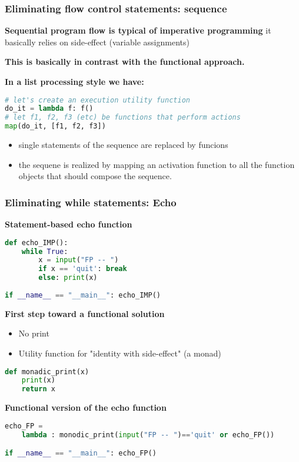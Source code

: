 \subsubsection{Eliminating flow control statements: sequence}

\textbf{Sequential program flow is typical of imperative programming}
it basically relies on side-effect (variable assignments)

\textbf{This is basically in contrast with the functional approach.}

\textbf{In a list processing style we have:}
\begin{lstlisting}[language=Python]
# let's create an execution utility function
do_it = lambda f: f()
# let f1, f2, f3 (etc) be functions that perform actions
map(do_it, [f1, f2, f3])
\end{lstlisting}
\begin{itemize}
	\item single statements of the sequence are replaced by funcions
	\item the sequene is realized by mapping an activation function to all the function objects that should compose the sequence.
\end{itemize}

\subsubsection{Eliminating while statements: Echo}

\textbf{Statement-based echo function}
\begin{lstlisting}[language=Python]
def echo_IMP():
	while True:
		x = input("FP -- ")
		if x == 'quit': break
		else: print(x)
		
if __name__ == "__main__": echo_IMP()
\end{lstlisting}

\textbf{First step toward a functional solution}
\begin{itemize}
	\item No print
	\item Utility function for "identity with side-effect" (a monad)
\end{itemize}
\begin{lstlisting}[language=Python]
def monadic_print(x)
	print(x)
	return x
\end{lstlisting}

\textbf{Functional version of the echo function}
\begin{lstlisting}[language=Python]
echo_FP = 
	lambda : monodic_print(input("FP -- ")=='quit' or echo_FP())

if __name__ == "__main__": echo_FP()
\end{lstlisting}

